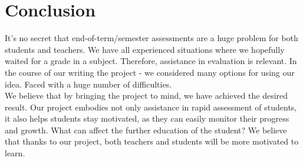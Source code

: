 \chapter{Conclusion}\label{ch:concl}
It's no secret that end-of-term/semester assessments are a huge problem for both students and teachers. We have all experienced situations where we hopefully waited for a grade in a subject. Therefore, assistance in evaluation is relevant. In the course of our writing the project - we considered many options for using our idea. Faced with a huge number of difficulties.
\\
We believe that by bringing the project to mind, we have achieved the desired result. Our project embodies not only assistance in rapid assessment of students, it also helps students stay motivated, as they can easily monitor their progress and growth. What can affect the further education of the student? We believe that thanks to our project, both teachers and students will be more motivated to learn.